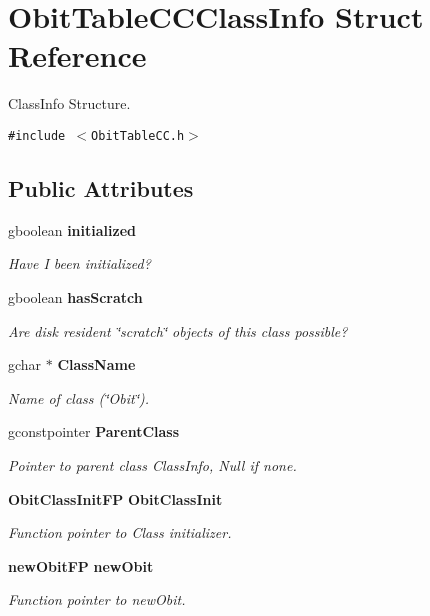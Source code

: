\section{Obit\-Table\-CCClass\-Info Struct Reference}
\label{structObitTableCCClassInfo}
Class\-Info Structure.  


{\tt \#include $<$Obit\-Table\-CC.h$>$}

\subsection*{Public Attributes}
\begin{CompactItemize}
\item 
gboolean {\bf initialized}
\begin{CompactList}\small\item\em Have I been initialized? \item\end{CompactList}\item 
gboolean {\bf has\-Scratch}
\begin{CompactList}\small\item\em Are disk resident \char`\"{}scratch\char`\"{} objects of this class possible? \item\end{CompactList}\item 
gchar $\ast$ {\bf Class\-Name}
\begin{CompactList}\small\item\em Name of class (\char`\"{}Obit\char`\"{}). \item\end{CompactList}\item 
gconstpointer {\bf Parent\-Class}
\begin{CompactList}\small\item\em Pointer to parent class Class\-Info, Null if none. \item\end{CompactList}\item 
{\bf Obit\-Class\-Init\-FP} {\bf Obit\-Class\-Init}
\begin{CompactList}\small\item\em Function pointer to Class initializer. \item\end{CompactList}\item 
{\bf new\-Obit\-FP} {\bf new\-Obit}
\begin{CompactList}\small\item\em Function pointer to new\-Obit. \item\end{CompactList}\item 

\end{CompactItemize}
